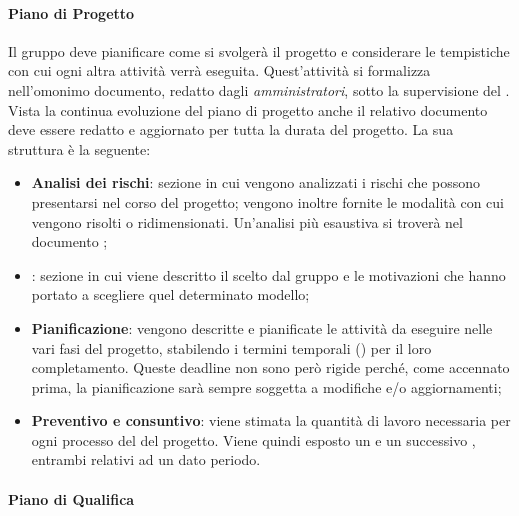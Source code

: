 \paragraph{Piano di Progetto}
\label{par:pdp}

Il gruppo deve pianificare come si svolgerà il progetto e considerare le tempistiche con cui ogni altra attività verrà
eseguita. Quest'attività si formalizza nell'omonimo documento, redatto dagli \emph{amministratori}, sotto la
supervisione del \emph{}. Vista la continua evoluzione del piano di progetto anche
il relativo documento deve essere redatto e aggiornato per tutta la durata del progetto. La sua struttura è la seguente:
\begin{itemize}
    \item \textbf{Analisi dei rischi}: sezione in cui vengono analizzati i rischi che possono presentarsi nel corso del
    progetto; vengono inoltre fornite le modalità con cui vengono risolti o ridimensionati. Un'analisi più esaustiva
    si troverà nel documento ;
    \item \textbf{}: sezione in cui viene descritto il 
    scelto dal gruppo e le motivazioni che hanno portato a scegliere quel determinato modello;
    \item \textbf{Pianificazione}: vengono descritte e pianificate le attività da eseguire nelle vari fasi del progetto,
    stabilendo i termini temporali () per il loro completamento. Queste deadline non sono però
    rigide perché, come accennato prima, la pianificazione sarà sempre soggetta a modifiche e/o aggiornamenti;
    \item \textbf{Preventivo e consuntivo}: viene stimata la quantità di lavoro necessaria per ogni processo del
     del progetto. Viene quindi esposto un  e un successivo
    , entrambi relativi ad un dato periodo.
\end{itemize}

\paragraph{Piano di Qualifica}

